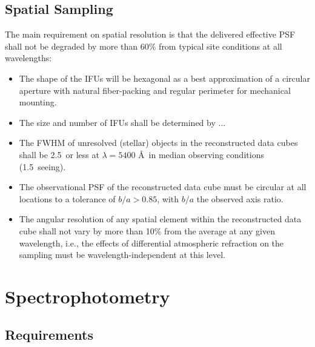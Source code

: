 \documentclass[preprint,11pt]{aastex}
\begin{document}
\subsection{Spatial Sampling}

\medskip
\noindent The main requirement on spatial resolution is that the delivered effective PSF shall not be degraded by more than 60\% from typical site conditions at all wavelengths:


\begin{itemize}

\item The shape of the IFUs will be hexagonal as a best approximation
  of a circular aperture with natural fiber-packing and regular
  perimeter for mechanical mounting.

\item The size and number of IFUs shall be determined by ...

\item The FWHM of unresolved (stellar) objects in the reconstructed data
  cubes shall be 2.5\arcsec\ or less at $\lambda = 5400$ \AA\ in median
  observing conditions (1.5\arcsec\ seeing).

\item The observational PSF of the reconstructed data cube must be
  circular at all locations to a tolerance of $b/a > 0.85$, with $b/a$
  the observed axis ratio.

\item The angular resolution of any spatial element within the
  reconstructed data cube shall not vary by more than 10\% from the
  average at any given wavelength, i.e., the effects of differential
  atmospheric refraction on the sampling must be
  wavelength-independent at this level.


\end{itemize}



\section{Spectrophotometry} \label{sec:spectrophotometry}

\subsection{Requirements}
\end{document}
